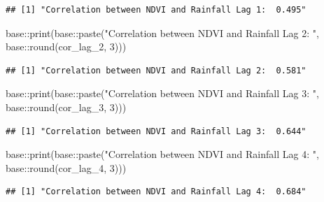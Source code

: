 \documentclass[
]{article}
\newenvironment{Shaded}{}{}
\newcommand{\DecValTok}[1]{\textcolor[rgb]{0.25,0.63,0.44}{#1}}
\newcommand{\FunctionTok}[1]{\textcolor[rgb]{0.02,0.16,0.49}{#1}}
\newcommand{\NormalTok}[1]{#1}
\newcommand{\SpecialCharTok}[1]{\textcolor[rgb]{0.25,0.44,0.63}{#1}}
\newcommand{\StringTok}[1]{\textcolor[rgb]{0.25,0.44,0.63}{#1}}
\begin{document}
\begin{verbatim}
## [1] "Correlation between NDVI and Rainfall Lag 1:  0.495"
\end{verbatim}

\begin{Shaded}
\begin{Highlighting}[]
\NormalTok{base}\SpecialCharTok{::}\FunctionTok{print}\NormalTok{(base}\SpecialCharTok{::}\FunctionTok{paste}\NormalTok{(}\StringTok{"Correlation between NDVI and Rainfall Lag 2: "}\NormalTok{, }
\NormalTok{                        base}\SpecialCharTok{::}\FunctionTok{round}\NormalTok{(cor\_lag\_2, }\DecValTok{3}\NormalTok{)))}
\end{Highlighting}
\end{Shaded}

\begin{verbatim}
## [1] "Correlation between NDVI and Rainfall Lag 2:  0.581"
\end{verbatim}

\begin{Shaded}
\begin{Highlighting}[]
\NormalTok{base}\SpecialCharTok{::}\FunctionTok{print}\NormalTok{(base}\SpecialCharTok{::}\FunctionTok{paste}\NormalTok{(}\StringTok{"Correlation between NDVI and Rainfall Lag 3: "}\NormalTok{, }
\NormalTok{                        base}\SpecialCharTok{::}\FunctionTok{round}\NormalTok{(cor\_lag\_3, }\DecValTok{3}\NormalTok{)))}
\end{Highlighting}
\end{Shaded}

\begin{verbatim}
## [1] "Correlation between NDVI and Rainfall Lag 3:  0.644"
\end{verbatim}

\begin{Shaded}
\begin{Highlighting}[]
\NormalTok{base}\SpecialCharTok{::}\FunctionTok{print}\NormalTok{(base}\SpecialCharTok{::}\FunctionTok{paste}\NormalTok{(}\StringTok{"Correlation between NDVI and Rainfall Lag 4: "}\NormalTok{, }
\NormalTok{                        base}\SpecialCharTok{::}\FunctionTok{round}\NormalTok{(cor\_lag\_4, }\DecValTok{3}\NormalTok{)))}
\end{Highlighting}
\end{Shaded}

\begin{verbatim}
## [1] "Correlation between NDVI and Rainfall Lag 4:  0.684"
\end{verbatim}
\end{document}
